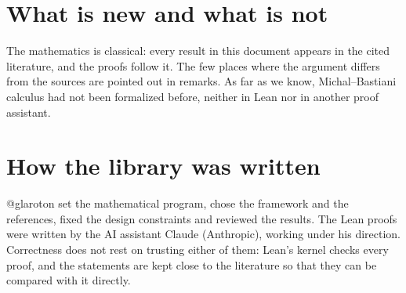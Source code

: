 \section*{What is new and what is not}

The mathematics is classical: every result in this document appears in the cited literature,
and the proofs follow it. The few places where the argument differs from the sources are
pointed out in remarks. As far as we know, Michal--Bastiani calculus had not been formalized
before, neither in Lean nor in another proof assistant.

\section*{How the library was written}

@glaroton set the mathematical program, chose the framework and the references, fixed
the design constraints and reviewed the results. The Lean proofs were written by the AI
assistant Claude (Anthropic), working under his direction. Correctness does not rest on trusting
either of them: Lean's kernel checks every proof, and the statements are kept close to the
literature so that they can be compared with it directly.
